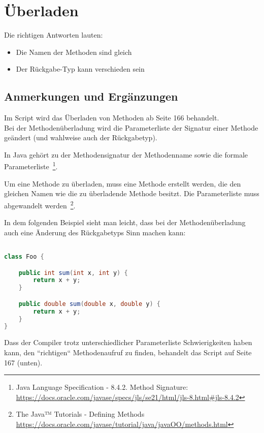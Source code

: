 \chapter{Überladen}\label{ueberladen}

Die richtigen Antworten lauten:

\begin{itemize}
    \item Die Namen der Methoden sind gleich
    \item Der Rückgabe-Typ kann verschieden sein
\end{itemize}


\section*{Anmerkungen und Ergänzungen}

Im Script wird das Überladen von Methoden ab Seite 166 behandelt.\\


Bei der Methodenüberladung wird die Parameterliste der Signatur einer Methode geändert (und wahlweise auch der Rückgabetyp).

In Java gehört zu der Methodensignatur der Methodenname sowie die formale Parameterliste~\footnote {
    Java Language Specification - 8.4.2. Method Signature: \url{https://docs.oracle.com/javase/specs/jls/se21/html/jls-8.html#jls-8.4.2}
}.

Um eine Methode zu überladen, muss eine Methode erstellt werden, die den gleichen Namen wie die zu überladende Methode besitzt.
Die Parameterliste muss abgewandelt werden~\footnote{The Java™ Tutorials - Defining Methods \url{https://docs.oracle.com/javase/tutorial/java/javaOO/methods.html}}.

In dem folgenden Beispiel sieht man leicht, dass bei der Methodenüberladung auch eine Änderung des Rückgabetyps Sinn machen kann:

\begin{lstlisting}[language=java]

class Foo {

    public int sum(int x, int y) {
        return x + y;
    }

    public double sum(double x, double y) {
        return x + y;
    }
}

\end{lstlisting}

Dass der Compiler trotz unterschiedlicher Parameterliste Schwierigkeiten haben kann, den ``richtigen`` Methodenaufruf zu finden,
behandelt das Script auf Seite 167 (unten).\\

